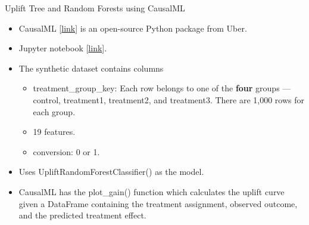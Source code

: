 \documentclass[20pt]{beamer}
\begin{document}
\begin{frame}{Uplift Tree and Random Forests using CausalML}
  \begin{itemize}
    \item CausalML [\href{https://readthedocs.org/projects/causalml/downloads/pdf/latest/}{link}] is an open-source Python package from Uber.

    \item Jupyter notebook [\href{https://github.com/uber/causalml/blob/master/examples/uplift_trees_with_synthetic_data.ipynb}{link}].

    \item The synthetic dataset contains columns

    \begin{itemize}
      \item {\ttfamily treatment\_group\_key}: Each row belongs to one of the \textbf{four} groups --- {\ttfamily control}, {\ttfamily treatment1}, {\ttfamily treatment2}, and {\ttfamily treatment3}. There are 1,000 rows for each group.

      \item 19 features.

      \item {\ttfamily conversion}: 0 or 1.

    \end{itemize}

    \item Uses {\ttfamily UpliftRandomForestClassifier()} as the model.

    \item CausalML has the {\ttfamily plot\_gain()} function which calculates the uplift curve given a DataFrame containing the treatment assignment, observed outcome, and the predicted treatment effect.
  \end{itemize}

\end{frame}
\end{document}
